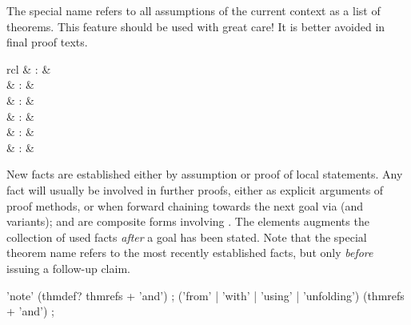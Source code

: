 \begin{isabellebody}
\begin{isamarkuptext}
  The special name \mbox{} refers to all assumptions of the
  current context as a list of theorems.  This feature should be used
  with great care!  It is better avoided in final proof texts.%
\end{isamarkuptext}%
\isamarkuptrue%
%
\isamarkuptrue%
%
\begin{isamarkuptext}%
\begin{matharray}{rcl}
    \mbox{} & : &  \\
    \mbox{} & : &  \\
    \mbox{} & : &  \\
    \mbox{} & : &  \\
    \mbox{} & : &  \\
    \mbox{} & : &  \\
  \end{matharray}

  New facts are established either by assumption or proof of local
  statements.  Any fact will usually be involved in further proofs,
  either as explicit arguments of proof methods, or when forward
  chaining towards the next goal via \mbox{} (and variants);
  \mbox{} and \mbox{} are composite forms
  involving \mbox{}.  The \mbox{} elements
  augments the collection of used facts \emph{after} a goal has been
  stated.  Note that the special theorem name \mbox{} refers
  to the most recently established facts, but only \emph{before}
  issuing a follow-up claim.

  \begin{rail}
    'note' (thmdef? thmrefs + 'and')
    ;
    ('from' | 'with' | 'using' | 'unfolding') (thmrefs + 'and')
    ;
  \end{rail}

  \begin{descr}


\end{descr}
\end{isamarkuptext}
\end{isabellebody}
